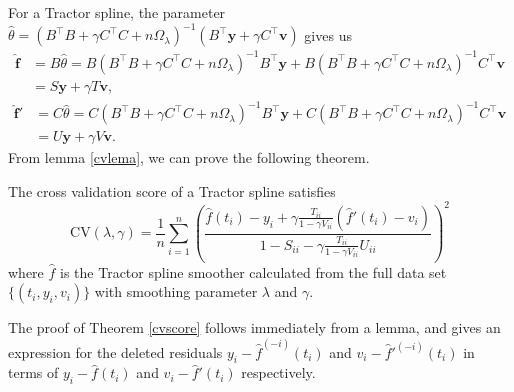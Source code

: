For a Tractor spline, the parameter $\hat{\theta}=(B^\top B+\gamma C^\top C+n\Omega_\lambda)^{-1}(B^\top\mathbf{y}+\gamma C^\top\mathbf{v})$ gives us
\begin{equation}
\begin{split}
 \hat{\mathbf{f}}&=B\hat{\theta}=B(B^\top B+\gamma C^\top C+n\Omega_\lambda)^{-1}B^\top\mathbf{y}+B(B^\top B+\gamma C^\top C+n\Omega_\lambda)^{-1}C^\top\mathbf{v}\\&=S\mathbf{y}+\gamma T\mathbf{v},
 \end{split}
 \end{equation}
 \begin{equation}
 \begin{split}
\hat{\mathbf{f}}'&=C\hat{\theta}=C(B^\top B+\gamma C^\top C+n\Omega_\lambda)^{-1}B^\top\mathbf{y}+C(B^\top B+\gamma C^\top C+n\Omega_\lambda)^{-1}C^\top\mathbf{v}\\&=U\mathbf{y}+\gamma V\mathbf{v}.
 \end{split}
\end{equation}
From lemma \ref{cvlema}, we can prove the following theorem.
\begin{theorem}\label{cvscore}
The cross validation score of a Tractor spline satisfies
\begin{equation}\label{tractorcv}
\mbox{CV}(\lambda,\gamma)=\frac{1}{n}\sum_{i=1}^{n} \left( \frac{\hat{f}(t_i)-y_i+\gamma \frac{T_{ii}}{1-\gamma V_{ii}}(\hat{f}'(t_i)-v_i)}{1-S_{ii}-\gamma\frac{T_{ii}}{1-\gamma V_{ii}}U_{ii}} \right)^2
\end{equation}
where $\hat{f}$ is the Tractor spline smoother calculated from the full data set $\{(t_i,y_i,v_i)\}$ with smoothing parameter $\lambda$ and $\gamma$.
\end{theorem}

The proof of Theorem \ref{cvscore} follows immediately from a lemma, and gives an expression for the deleted residuals $y_i-\hat{f}^{(-i)}(t_i)$ and $v_i-\hat{f}'^{(-i)}(t_i)$ in terms of $y_i-\hat{f}(t_i)$ and $v_i-\hat{f}'(t_i)$ respectively. 

